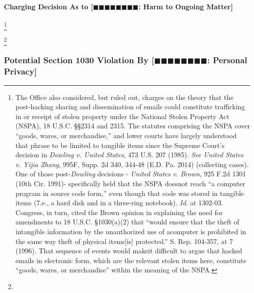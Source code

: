 \paragraph{Charging Decision As to [$\blacksquare\blacksquare\blacksquare\blacksquare\blacksquare\blacksquare\blacksquare\blacksquare$: Harm to Ongoing Matter]}
\footnote{The Office also considered, but ruled out, charges on the theory that the post-hacking sharing and dissemination of emails could constitute trafficking in or receipt of stolen property under the National Stolen Property Act (NSPA), 18 U.S.C. \S\S 2314 and 2315.
The statutes comprising the NSPA cover “goods, wares, or merchandise,” and lower courts have largely understood that phrase to be limited to tangible items since the Supreme Court’s decision in \textit{Dowling v. United States}, 473 U.S. 207 (1985).
\textit{See United States v. Yijia Zhang}, 995F, Supp. 2d 340, 344-48 (E.D. Pa. 2014) (collecting cases).
One of those post-\textit{Dowling} decisions - \textit{United States v. Brown}, 925 F.2d 1301 (10th Cir. 1991)- specifically held that the NSPA doesnot reach “a computer program in source code form,” even though that code was stored in tangible items (7.e., a hard disk and in a three-ring notebook).
\textit{Id}. at 1302-03.
Congress, in turn, cited the Brown opinion in explaining the need for amendments to 18 U.S.C. \S 1030(a)(2) that “would ensure that the theft of intangible information by the unauthorized use of acomputer is prohibited in the same way theft of physical items[is] protected.”
S. Rep. 104-357, at 7 (1996).
That sequence of events would makeit difficult to argue that hacked emails in electronic form, which are the relevant stolen items here, constitute “goods, wares, or merchandise” within the meaning of the NSPA.}




\footnote{}






\subsubsection{Potential Section 1030 Violation By [$\blacksquare\blacksquare\blacksquare\blacksquare\blacksquare\blacksquare\blacksquare\blacksquare$: Personal Privacy]}

